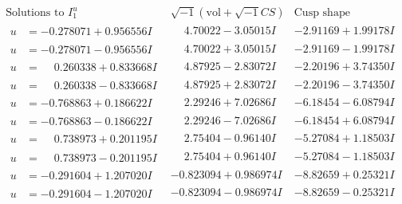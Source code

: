 \documentclass[1p]{elsarticle_modified}
\theoremstyle{definition}
\newcommand{\I}{\sqrt{-1}}
\begin{document}
$$\begin{array}{c|c|c}  
\text{Solutions to }I^u_{1}& \I (\text{vol} + \sqrt{-1}CS) & \text{Cusp shape}\\
 \hline 
\begin{aligned}
u &= -0.278071 + 0.956556 I\end{aligned}
 & \phantom{-}4.70022 - 3.05015 I & -2.91169 + 1.99178 I \\ \hline\begin{aligned}
u &= -0.278071 - 0.956556 I\end{aligned}
 & \phantom{-}4.70022 + 3.05015 I & -2.91169 - 1.99178 I \\ \hline\begin{aligned}
u &= \phantom{-}0.260338 + 0.833668 I\end{aligned}
 & \phantom{-}4.87925 - 2.83072 I & -2.20196 + 3.74350 I \\ \hline\begin{aligned}
u &= \phantom{-}0.260338 - 0.833668 I\end{aligned}
 & \phantom{-}4.87925 + 2.83072 I & -2.20196 - 3.74350 I \\ \hline\begin{aligned}
u &= -0.768863 + 0.186622 I\end{aligned}
 & \phantom{-}2.29246 + 7.02686 I & -6.18454 - 6.08794 I \\ \hline\begin{aligned}
u &= -0.768863 - 0.186622 I\end{aligned}
 & \phantom{-}2.29246 - 7.02686 I & -6.18454 + 6.08794 I \\ \hline\begin{aligned}
u &= \phantom{-}0.738973 + 0.201195 I\end{aligned}
 & \phantom{-}2.75404 - 0.96140 I & -5.27084 + 1.18503 I \\ \hline\begin{aligned}
u &= \phantom{-}0.738973 - 0.201195 I\end{aligned}
 & \phantom{-}2.75404 + 0.96140 I & -5.27084 - 1.18503 I \\ \hline\begin{aligned}
u &= -0.291604 + 1.207020 I\end{aligned}
 & -0.823094 + 0.986974 I & -8.82659 + 0.25321 I \\ \hline\begin{aligned}
u &= -0.291604 - 1.207020 I\end{aligned}
 & -0.823094 - 0.986974 I & -8.82659 - 0.25321 I \\ \hline\begin{aligned}

\end{aligned}
\end{array}$$
\end{document}
